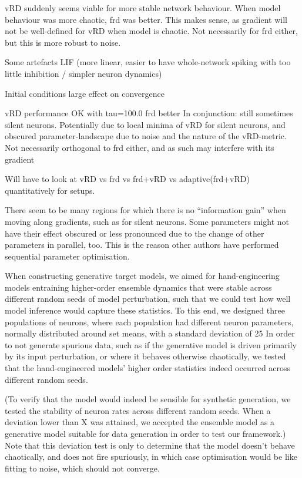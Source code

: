 \documentclass[mphil,deptreport,ai]{infthesis} %
\begin{document}
vRD suddenly seems viable for more stable network behaviour. When model behaviour was more chaotic, frd was better. This makes sense, as gradient will not be well-defined for vRD when model is chaotic. Not necessarily for frd either, but this is more robust to noise.

Some artefacts LIF (more linear, easier to have whole-network spiking with too little inhibition / simpler neuron dynamics)

Initial conditions large effect on convergence

vRD performance OK with tau=100.0
frd better
In conjunction: still sometimes silent neurons. Potentially due to local minima of vRD for silent neurons, and obscured parameter-landscape due to noise and the nature of the vRD-metric. Not necessarily orthogonal to frd either, and as such may interfere with its gradient

Will have to look at vRD vs frd vs frd+vRD vs adaptive(frd+vRD) quantitatively for setups.

There seem to be many regions for which there is no “information gain” when moving along gradients, such as for silent neurons. Some parameters might not have their effect obscured or less pronounced due to the change of other parameters in parallel, too. This is the reason other authors have performed sequential parameter optimisation.

When constructing generative target models, we aimed for hand-engineering models entraining higher-order ensemble dynamics that were stable across different random seeds of model perturbation, such that we could test how well model inference would capture these statistics. To this end, we designed three populations of neurons, where each population had different neuron parameters, normally distributed around set means, with a standard deviation of 25 %
In order to not generate spurious data, such as if the generative model is driven primarily by its input perturbation, or where it behaves otherwise chaotically, we tested that the hand-engineered models’ higher order statistics indeed occurred across different random seeds.

(To verify that the model would indeed be sensible for synthetic generation, we tested the stability of neuron rates across different random seeds. When a deviation lower than X was attained, we accepted the ensemble model as a generative model suitable for data generation in order to test our framework.)
Note that this deviation test is only to determine that the model doesn’t behave chaotically, and does not fire spuriously, in which case optimisation would be like fitting to noise, which should not converge.
\end{document}
